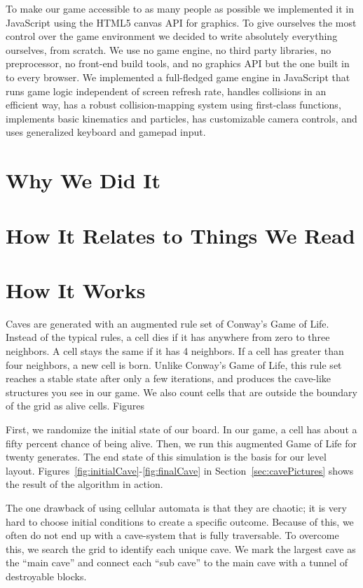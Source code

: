 \documentclass[a4paper, 12pt]{article}
\begin{document}
To make our game accessible to as many people as possible we implemented it in
JavaScript using the HTML5 canvas API for graphics. To give ourselves the most
control over the game environment we decided to write absolutely everything
ourselves, from scratch. We use no game engine, no third party libraries, no
preprocessor, no front-end build tools, and no graphics API but the one built in
to every browser. We implemented a full-fledged game engine in JavaScript that
runs game logic independent of screen refresh rate, handles collisions in an
efficient way, has a robust collision-mapping system using first-class
functions, implements basic kinematics and particles, has customizable camera
controls, and uses generalized keyboard and gamepad input.

\section{Why We Did It}


\section{How It Relates to Things We Read}


\section{How It Works}

Caves are generated with an augmented rule set of Conway's Game of Life. Instead
of the typical rules, a cell dies if it has anywhere from zero to three
neighbors. A cell stays the same if it has 4 neighbors. If a cell has greater
than four neighbors, a new cell is born. Unlike Conway's Game of Life, this
rule set reaches a stable state after only a few iterations, and produces the
cave-like structures you see in our game. We also count cells that are outside
the boundary of the grid as alive cells. Figures

First, we randomize the initial state of our board. In our game, a cell has
about a fifty percent chance of being alive. Then, we run this augmented Game of
Life for twenty generates. The end state of this simulation is the basis for our
level layout. Figures~\ref{fig:initialCave}-\ref{fig:finalCave} in
Section~\ref{sec:cavePictures} shows the result of the algorithm in action.

The one drawback of using cellular automata is that they are chaotic; it is very
hard to choose initial conditions to create a specific outcome. Because of this,
we often do not end up with a cave-system that is fully traversable. To overcome
this, we search the grid to identify each unique cave. We mark the largest cave
as the ``main cave'' and connect each ``sub cave'' to the main cave with a
tunnel of destroyable blocks.
\end{document}
